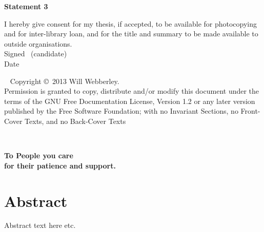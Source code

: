 \vfill

\textbf{\large Statement 3}

I hereby give consent for my thesis, if accepted, to be available for photocopying and for inter-library loan,
 and for the title and summary to be made available to outside organisations.\\[2ex]
Signed \dotfill \ (candidate) \hspace*{10em}\\[1ex]
Date\ \ \ \ \ \dotfill \hspace*{18em}

\vfill

\cleardoublepage


\thispagestyle{plain}
\ \vfill{\small
Copyright \copyright\ 2013 Will Webberley.\\
Permission is granted to copy, distribute and/or modify this document
under the terms of the GNU Free Documentation License, Version 1.2 or
any later version published by the Free Software Foundation; with no
Invariant Sections, no Front-Cover Texts, and no Back-Cover Texts}\\[3.5ex]
\cleardoublepage


\ \vspace*{1.11cm}
\begin{flushright}
\textbf{\large To People you care}\\
\textbf{\large for their patience and support.}
\end{flushright}
\newpage
\markboth{}{}
\cleardoublepage


\chapter{Abstract}
Abstract text here etc.

\tableofcontents

\listoffigures
\listoftables




\mainmatter 


















